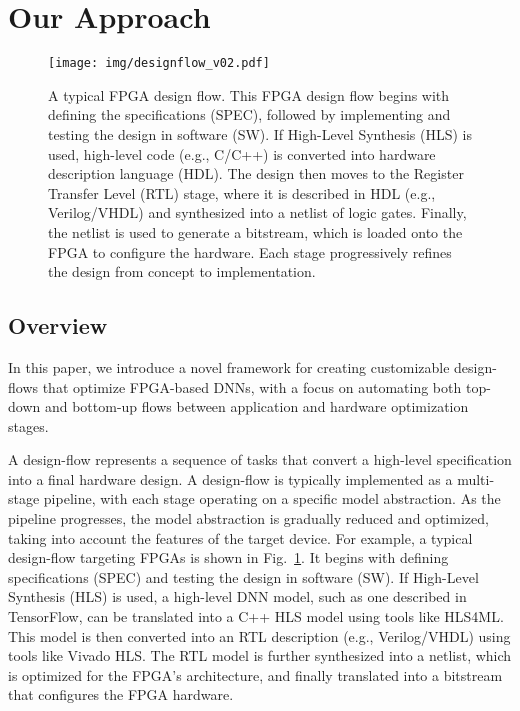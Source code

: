\section{Our Approach} \label{sec:approach}


\begin{figure}
\begin{center}
\texttt{[image: img/designflow\_v02.pdf]}
\end{center}
   \caption{A typical FPGA design flow. This FPGA design flow begins with defining the specifications (SPEC), followed by implementing and testing the design in software (SW). If High-Level Synthesis (HLS) is used, high-level code (e.g., C/C++) is converted into hardware description language (HDL). The design then moves to the Register Transfer Level (RTL) stage, where it is described in HDL (e.g., Verilog/VHDL) and synthesized into a netlist of logic gates. Finally, the netlist is used to generate a bitstream, which is loaded onto the FPGA to configure the hardware. Each stage progressively refines the design from concept to implementation.}
\label{fig:designflow}
\end{figure}



\subsection{Overview}

In this paper, we introduce a novel framework for creating customizable design-flows that optimize FPGA-based DNNs, with a focus on automating both top-down and bottom-up flows between application and hardware optimization stages.

A design-flow represents a sequence of tasks that convert a high-level specification into a final hardware design. A design-flow is typically implemented as a multi-stage pipeline, with each stage operating on a specific model abstraction. As the pipeline progresses, the model abstraction is gradually reduced and optimized, taking into account the features of the target device. For example, a typical design-flow targeting FPGAs is shown in Fig.~\ref{fig:designflow}. It begins with defining specifications (SPEC) and testing the design in software (SW). If High-Level Synthesis (HLS) is used, a high-level DNN model, such as one described in TensorFlow, can be translated into a C++ HLS model using tools like HLS4ML. This model is then converted into an RTL description (e.g., Verilog/VHDL) using tools like Vivado HLS. The RTL model is further synthesized into a netlist, which is optimized for the FPGA’s architecture, and finally translated into a bitstream that configures the FPGA hardware. 

